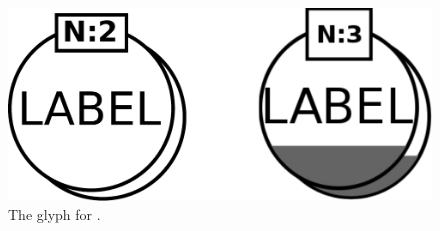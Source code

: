 \begin{figure}[H]
  \centering
  \includegraphics[scale = 0.3]{images/simpleChemicalMultimer}
  \caption{The \PD glyph for .}
  \label{fig:multimer}
\end{figure}


